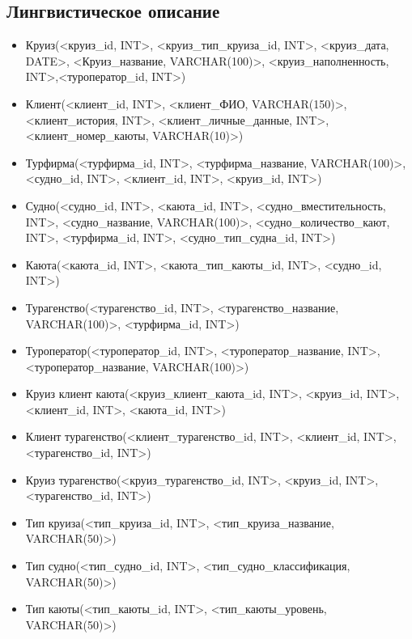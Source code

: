 \documentclass[11pt,a4paper,final]{article}
\begin{document}
\subsection{Лингвистическое описание}
\begin{itemize}
\item Круиз(<круиз\_id, INT>, <круиз\_тип\_круиза\_id, INT>, <круиз\_дата, DATE>, <Круиз\_название, VARCHAR(100)>, <круиз\_наполненность, INT>,<туроператор\_id, INT>)
\item Клиент(<клиент\_id, INT>, <клиент\_ФИО, VARCHAR(150)>, <клиент\_история, INT>, <клиент\_личные\_данные, INT>, <клиент\_номер\_каюты, VARCHAR(10)>) 
\item Турфирма(<турфирма\_id, INT>, <турфирма\_название, VARCHAR(100)>, <судно\_id, INT>, <клиент\_id, INT>, <круиз\_id, INT>)
\item Судно(<судно\_id, INT>, <каюта\_id, INT>, <судно\_вместительность, INT>, <судно\_название, VARCHAR(100)>, <судно\_количество\_кают, INT>, <турфирма\_id, INT>, <судно\_тип\_судна\_id, INT>)
\item Каюта(<каюта\_id, INT>, <каюта\_тип\_каюты\_id, INT>, <судно\_id, INT>) 
\item Турагенство(<турагенство\_id, INT>, <турагенство\_название, VARCHAR(100)>, <турфирма\_id, INT>) 
\item Туроператор(<туроператор\_id, INT>, <туроператор\_название, INT>, <туроператор\_название, VARCHAR(100)>) 
\item Круиз клиент каюта(<круиз\_клиент\_каюта\_id, INT>,  <круиз\_id, INT>, <клиент\_id, INT>, <каюта\_id, INT>)
\item Клиент турагенство(<клиент\_турагенство\_id, INT>, <клиент\_id, INT>, <турагенство\_id, INT>) 
\item Круиз турагенство(<круиз\_турагенство\_id, INT>, <круиз\_id, INT>, <турагенство\_id, INT>) 
\item Тип круиза(<тип\_круиза\_id, INT>, <тип\_круиза\_название, VARCHAR(50)>)
\item Тип судно(<тип\_судно\_id, INT>, <тип\_судно\_классификация, VARCHAR(50)>)
\item Тип каюты(<тип\_каюты\_id, INT>, <тип\_каюты\_уровень, VARCHAR(50)>)
\end{itemize}
\end{document}
